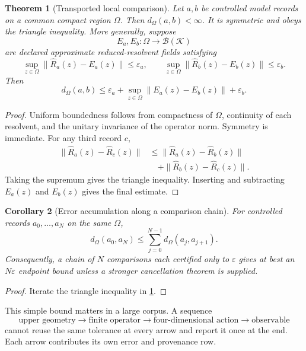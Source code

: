 \documentclass[11pt]{article}
\newtheorem{theorem}{Theorem}[section]
\newtheorem{corollary}[theorem]{Corollary}
\theoremstyle{definition}
\theoremstyle{remark}
\newcommand{\cK}{\mathcal K}
\newcommand{\1}{\mathbf 1}
\begin{document}
\begin{theorem}[Transported local comparison]
\label{thm:transported}
Let \(a,b\) be controlled model records on a common compact region
\(\Omega\).  Then \(d_\Omega(a,b)<\infty\).  It is symmetric and obeys
the triangle inequality.  More generally, suppose
\[
 E_a,E_b:\Omega\to\mathcal B(\cK)
\]
are declared approximate reduced-resolvent fields satisfying
\[
 \sup_{z\in\Omega}\|\widehat R_a(z)-E_a(z)\|
 \leq\varepsilon_a,
 \qquad
 \sup_{z\in\Omega}\|\widehat R_b(z)-E_b(z)\|
 \leq\varepsilon_b.
\]
Then
\[
 d_\Omega(a,b)
 \leq
 \varepsilon_a
 +
 \sup_{z\in\Omega}\|E_a(z)-E_b(z)\|
 +
 \varepsilon_b.
\]
\end{theorem}

\begin{proof}
Uniform boundedness follows from compactness of \(\Omega\), continuity of
each resolvent, and the unitary invariance of the operator norm.  Symmetry
is immediate.  For any third record \(c\),
\[
\begin{aligned}
\|\widehat R_a(z)-\widehat R_c(z)\|
&\leq
\|\widehat R_a(z)-\widehat R_b(z)\|\\
&\quad+
\|\widehat R_b(z)-\widehat R_c(z)\|.
\end{aligned}
\]
Taking the supremum gives the triangle inequality.  Inserting and
subtracting \(E_a(z)\) and \(E_b(z)\) gives the final estimate.
\end{proof}

\begin{corollary}[Error accumulation along a comparison chain]
\label{cor:chain}
For controlled records \(a_0,\ldots,a_N\) on the same \(\Omega\),
\[
 d_\Omega(a_0,a_N)
 \leq
 \sum_{j=0}^{N-1}d_\Omega(a_j,a_{j+1}).
\]
Consequently, a chain of \(N\) comparisons each certified only to
\(\varepsilon\) gives at best an \(N\varepsilon\) endpoint bound unless a
stronger cancellation theorem is supplied.
\end{corollary}

\begin{proof}
Iterate the triangle inequality in
\cref{thm:transported}.
\end{proof}

This simple bound matters in a large corpus.  A sequence
\[
 \text{upper geometry}
 \longrightarrow
 \text{finite operator}
 \longrightarrow
 \text{four-dimensional action}
 \longrightarrow
 \text{observable}
\]
cannot reuse the same tolerance at every arrow and report it once at the
end.  Each arrow contributes its own error and provenance row.
\end{document}
